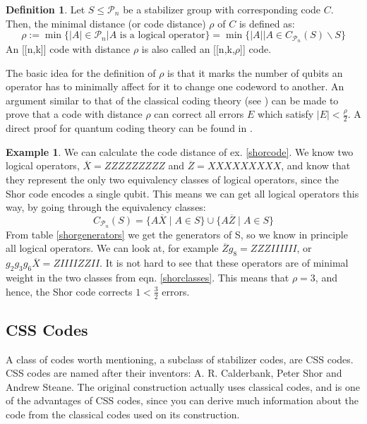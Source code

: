 \documentclass{article}
\def\P{\mathcal{P}}
\theoremstyle{definition}
\newtheorem{ex}[Satz]{Example}
\newtheorem{defn}[Satz]{Definition}
\begin{document}

\begin{defn}
Let $S \leq \P_n$ be a stabilizer group with corresponding code $C$. Then, the minimal distance (or code distance) $\rho$ of $C$ is defined as:
\begin{equation} \rho := \min \{ |A| \in \P_n | A \text{ is a logical operator} \} = \min \{ |A| \mid A \in C_{\P_n}(S)\backslash S \} \end{equation}
An [[n,k]] code with distance $\rho$ is also called an [[n,k,$\rho$]] code.
\end{defn}

The basic idea for the definition of $\rho$ is that it marks the number of qubits an operator has to minimally affect for it to change one codeword to another. 
An argument similar to that of the classical coding theory (see \cite{classicalcodes}) can be made to prove that a code with distance $\rho$ can correct all errors $E$ which satisfy $|E| < \frac{\rho}{2}$. A direct proof for quantum coding theory can be found in \cite{leemhuis}.

\begin{ex}
We can calculate the code distance of ex.  \ref{shorcode}. We know two logical operators, $\overline X = ZZZZZZZZZ$ and $\overline Z = XXXXXXXXX$, and know that they represent the only two equivalency classes of logical operators, since the Shor code encodes a single qubit.
This means we can get all logical operators this way, by going through the equivalency classes: \begin{equation}\label{shorclasses} C_{\P_n}(S) = \{ A \overline X \mid A \in S \} \cup \{ A \overline Z \mid A \in S \} \end{equation} From table  \ref{shorgenerators} we get the generators of S, so we know in principle all logical operators.
We can look at, for example $ \overline Z g_8 = ZZZIIIIII$, or $g_2 g_3 g_6 \overline X = ZIIIIZZII$. It is not hard to see that these operators are of minimal weight in the two classes from eqn.  \ref{shorclasses}. This means that $\rho = 3$, and hence, 
the Shor code corrects $1 < \frac{3}{2}$ errors. 
\end{ex}

\subsection{CSS Codes}

A class of codes worth mentioning, a subclass of stabilizer codes, are CSS codes. CSS codes are named after their inventors: A. R. Calderbank, Peter Shor and Andrew Steane.
The original construction actually uses classical codes, and is one of the advantages of CSS codes, since you can derive much information about the code from the classical codes used on its construction. 
\end{document}
